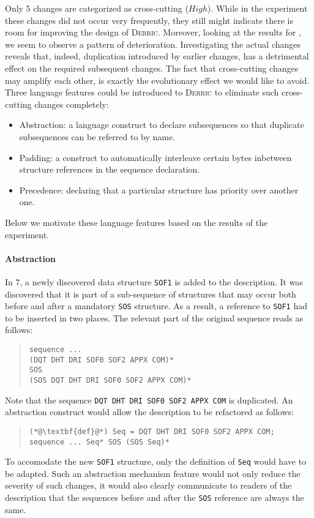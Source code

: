 \documentclass[a4paper]{llncs}
\def\derric{\textsc{Derric}\xspace}
\newcommand{\JPEG}{\textsmaller{JPEG}\xspace}
\def\identifier#1{\texttt{#1}}
\def\levelBad{\ensuremath{High}\xspace}
\begin{document}
Only 5 changes are categorized as cross-cutting (\levelBad).
While in the experiment these changes did not occur very frequently, they still might indicate there is room for improving the design of \derric.
Moreover, looking at the results for \JPEG, we seem to observe a pattern of deterioration.
Investigating the actual changes reveals that, indeed, duplication introduced by earlier changes, has a detrimental effect on the required subsequent changes.
The fact that cross-cutting changes may amplify each other, is exactly the evolutionary effect we would like to avoid.
Three language features could be introduced to \derric to eliminate such cross-cutting changes completely:
\begin{itemize}
\item Abstraction: a language construct to declare subsequences so that duplicate subsequences can be referred to by name.
\item Padding: a construct to automatically interleave certain bytes inbetween structure references in the sequence declaration.
\item Precedence: declaring that a particular structure has priority over another one. 
\end{itemize}
Below we motivate these language features based on the results of the experiment.

\paragraph{Abstraction}

In \JPEG 7, a newly discovered data structure \texttt{SOF1} is added to the description.
It was discovered that it is part of a sub-sequence of structures that may occur both before and after a mandatory \texttt{SOS} structure.
As a result, a reference to \identifier{SOF1} had to be inserted in two places.
The relevant part of the original sequence reads as follows:
\begin{quote}\begin{lstlisting}[language=derric]
sequence ...
(DQT DHT DRI SOF0 SOF2 APPX COM)*
SOS
(SOS DQT DHT DRI SOF0 SOF2 APPX COM)*
\end{lstlisting}
\end{quote}
Note that the sequence \lstinline[language=derric]{DQT DHT DRI SOF0 SOF2 APPX COM} is duplicated. 
An abstraction construct  would allow the description to be refactored as follows:
\begin{quote}\begin{lstlisting}[language=derric]
(*@\textbf{def}@*) Seq = DQT DHT DRI SOF0 SOF2 APPX COM;
sequence ... Seq* SOS (SOS Seq)*
\end{lstlisting}
\end{quote}
To accomodate the new \identifier{SOF1} structure, only the definition of \identifier{Seq} would have to be adapted.
Such an abstraction mechanism feature would not only reduce the severity of such changes, it would also clearly communicate to readers of the description that the sequences before and after the \texttt{SOS} reference are always the same.
\end{document}
